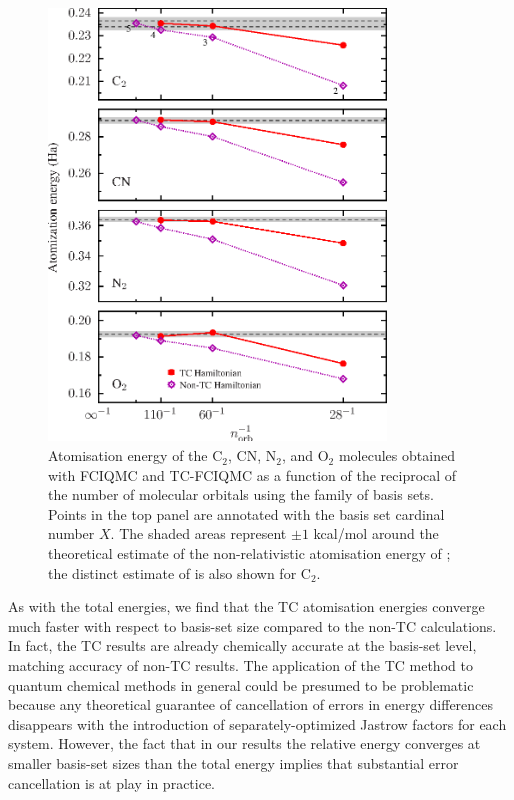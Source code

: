 %
\begin{figure}[!hbt]
  \begin{center}
    \includegraphics[width=0.8\textwidth]{figures/optimisation/Fig/bsdep-dimers-nontc}
    \caption{
      Atomisation energy of the C$_2$, CN, N$_2$, and O$_2$ molecules
      obtained with FCIQMC and TC-FCIQMC as a function of the
      reciprocal of the number of molecular orbitals using the
       family of basis sets.
      Points in the top panel are annotated with the basis set
      cardinal number $X$.
      The shaded areas represent $\pm 1$ kcal/mol around the
      theoretical estimate of the non-relativistic atomisation energy
      of ; the distinct
      estimate of  is also
      shown for C$_2$.
    }
    \label{fig:bsdep-dimers-nontc}
  \end{center}
\end{figure}

As with the total energies, we find that the TC atomisation energies converge much faster with respect to basis-set size compared to the non-TC calculations. In fact, the TC results are already chemically accurate at the \vtz basis-set level, matching accuracy of  non-TC results. The application of the TC method to quantum chemical methods in
general could be presumed to be problematic because any theoretical
guarantee of cancellation of errors in energy differences disappears
with the introduction of separately-optimized Jastrow factors for each
system.
%
However, the fact that in our results the relative energy converges at
smaller basis-set sizes than the total energy implies that substantial
error cancellation is at play in practice.

